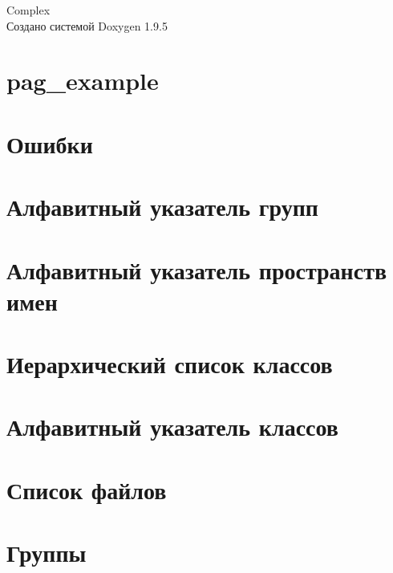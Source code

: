 \documentclass[twoside]{book}
\newcommand{\+}{\discretionary{\mbox{\scriptsize$\hookleftarrow$}}{}{}}
\newcommand{\clearemptydoublepage}{%
    \newpage{\pagestyle{empty}\cleardoublepage}%
  }
\begin{document}
  \raggedbottom
    \hypersetup{pageanchor=false,
                bookmarksnumbered=true,
                pdfencoding=unicode
               }
  \begin{titlepage}
  \vspace*{7cm}
  \begin{center}%
  {\Large Complex}\\
  \vspace*{1cm}
  {\large Создано системой Doxygen 1.9.5}\\
  \end{center}
  \end{titlepage}
  \clearemptydoublepage
  \tableofcontents
  \clearemptydoublepage
  \hypersetup{pageanchor=true}
\chapter{pag\+\_\+example}
\label{pag_example}

\chapter{Ошибки}
\label{bug}

\chapter{Алфавитный указатель групп}

\chapter{Алфавитный указатель пространств имен}

\chapter{Иерархический список классов}

\chapter{Алфавитный указатель классов}

\chapter{Список файлов}

\chapter{Группы}









\end{document}
